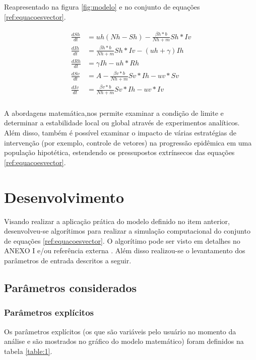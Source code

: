 \documentclass[conference]{IEEEtran}
\begin{document}
Reapresentado na figura \ref{fig:modelo} e no conjunto de equações \ref{ref:equacoesvector}.

\begin{align} \label{ref:equacoesvector}
\begin{split}
    \frac{dSh}{dt} &= uh (Nh - Sh) - \frac{\beta h* b}{Nh + m} Sh * Iv\\
    \frac{dIh}{dt} &= \frac{\beta h * b}{Nh + m} Sh * Iv - (uh + \gamma)Ih\\
    \frac{dRh}{dt} &=  \gamma Ih - uh*Rh\\
    \frac{dSv}{dt} &= A - \frac{\beta v* b}{Nh + m} Sv * Ih - uv*Sv\\
    \frac{dIv}{dt} &=  \frac{\beta v * b}{Nh + m} Sv * Ih - uv*Iv
\end{split}
\end{align}\\

A abordagens matemática,nos permite examinar a condição de limite e determinar a estabilidade local ou global através de experimentos analíticos. Além disso, também é possível examinar o impacto de várias estratégias de intervenção (por exemplo, controle de vetores) na progressão epidêmica em uma população hipotética, estendendo os pressupostos extrínsecos das equações \ref{ref:equacoesvector}\cite{nishiura2006mathematical}.

\section{Desenvolvimento}

Visando realizar a aplicação prática do modelo definido no item anterior, desenvolveu-se algorítimos para realizar a simulação computacional do conjunto de equações \ref{ref:equacoesvector}. O algorítimo pode ser visto em detalhes no ANEXO I e/ou referência externa \cite{mileo}. Além disso realizou-se o levantamento dos parâmetros de entrada descritos a seguir.

\subsection{Parâmetros considerados}

\subsubsection{Parâmetros explícitos}
Os parâmetros explícitos (os que são variáveis pelo usuário no momento da análise e são mostrados no gráfico do modelo matemático) foram definidos na tabela \ref{table:1}.
\end{document}
